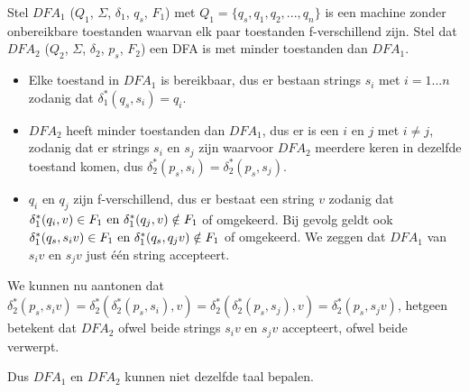   Stel $DFA_1$ ($Q_1$, $\Sigma$, $\delta_1$, $q_s$, $F_1$) met $Q_1 = \{q_s,q_1,q_2,...,q_n\}$ is een machine zonder onbereikbare toestanden waarvan elk paar toestanden f-verschillend zijn. Stel dat $DFA_2$ ($Q_2$, $\Sigma$, $\delta_2$, $p_s$, $F_2$) een DFA is met minder toestanden dan $DFA_1$.

  \begin{itemize}
  \item Elke toestand in $DFA_1$ is bereikbaar, dus er bestaan strings $s_i$ met $i=1...n$ zodanig dat $\delta^*_1(q_s,s_i)=q_i$.
  \item $DFA_2$ heeft minder toestanden dan $DFA_1$, dus er is een $i$ en $j$ met $i \neq j$, zodanig dat er strings $s_i$ en $s_j$ zijn waarvoor $DFA_2$ meerdere keren in dezelfde toestand komen, dus $\delta^*_2(p_s,s_i)=\delta^*_2(p_s,s_j)$.
  \item $q_i$ en $q_j$ zijn f-verschillend, dus er bestaat een string $v$ zodanig dat $\delta^*_1(q_i,v) \in F_1 \text{ en } \delta^*_1(q_j,v) \notin F_1$ of omgekeerd. Bij gevolg geldt ook $\delta^*_1(q_s,s_iv) \in F_1 \text{ en } \delta^*_1(q_s,q_jv) \notin F_1$ of omgekeerd. We zeggen dat $DFA_1$ van $s_iv$ en $s_jv$ just \'e\'en string accepteert.
  \end{itemize}
  
  We kunnen nu aantonen dat $\delta^*_2(p_s,s_iv) = \delta^*_2(\delta^*_2(p_s,s_i),v) = \delta^*_2(\delta^*_2(p_s,s_j),v) = \delta^*_2(p_s,s_jv)$, hetgeen betekent dat $DFA_2$ ofwel beide strings $s_iv$ en $s_jv$ accepteert, ofwel beide verwerpt.
  
  Dus $DFA_1$ en $DFA_2$ kunnen niet dezelfde taal bepalen.